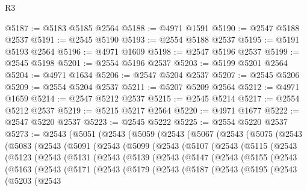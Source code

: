 \begin{lexlean}{R3}
\begin{coremodule}
@5187 := @5183 @5185 @2564
@5188 := @4971 @1591
@5190 := @2547 @5188 @2537
@5191 := @2545 @5190
@5193 := @2554 @5188 @2537
@5195 := @5191 @5193 @2564
@5196 := @4971 @1609
@5198 := @2547 @5196 @2537
@5199 := @2545 @5198
@5201 := @2554 @5196 @2537
@5203 := @5199 @5201 @2564
@5204 := @4971 @1634
@5206 := @2547 @5204 @2537
@5207 := @2545 @5206
@5209 := @2554 @5204 @2537
@5211 := @5207 @5209 @2564
@5212 := @4971 @1659
@5214 := @2547 @5212 @2537
@5215 := @2545 @5214
@5217 := @2554 @5212 @2537
@5219 := @5215 @5217 @2564
@5220 := @4971 @1677
@5222 := @2547 @5220 @2537
@5223 := @2545 @5222
@5225 := @2554 @5220 @2537
@5273 := @2543
    (@5051
      (@2543
        (@5059
          (@2543
            (@5067
              (@2543
                (@5075
                  (@2543
                    (@5083
                      (@2543
                        (@5091
                          (@2543
                            (@5099
                              (@2543
                                (@5107
                                  (@2543
                                    (@5115
                                      (@2543
                                        (@5123
                                          (@2543
                                            (@5131
                                              (@2543
                                                (@5139
                                                  (@2543
                                                    (@5147
                                                      (@2543
                                                        (@5155
                                                          (@2543
                                                            (@5163
                                                              (@2543
                                                                (@5171
                                                                  (@2543
                                                                    (@5179
                                                                      (@2543
                                                                        (@5187
                                                                          (@2543
                                                                            (@5195
                                                                              (@2543
                                                                                (@5203
                                                                                  (@2543

\end{coremodule}
\end{lexlean}
